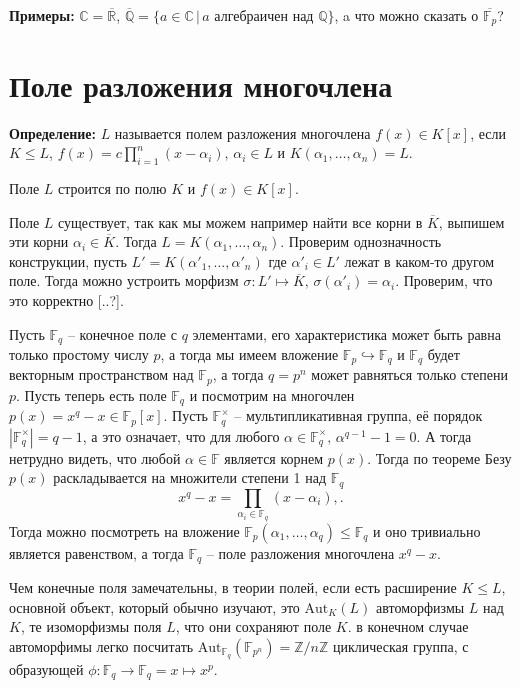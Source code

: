 \documentclass[a4paper, 12pt]{book}
\begin{document}
\textbf{Примеры:} $\mathbb{C}=\overline{\mathbb{R}}$, $\overline{\mathbb{Q}}=\{a\in
\mathbb{C}\,|\,a\text{ алгебраичен над }\mathbb{Q}\}$, a что можно сказать о
$\overline{\mathbb{F}_p}$?

\section{Поле разложения многочлена}

\textbf{Определение:} $L$ называется полем разложения многочлена $f(x)\in K[x]$,
если $K\le L$, $f(x)=c\prod_{i=1}^n(x-\alpha_i),\,\alpha_i\in L$ и $K(\alpha_1,
\ldots,\alpha_n)=L$.

Поле $L$ строится по полю $K$ и $f(x)\in K[x]$.

Поле $L$ существует, так как мы можем например найти все корни в $\overline K$,
выпишем эти корни $\alpha_i\in\overline K$. Тогда $L=K(\alpha_1,\ldots,\alpha_n)$.
Проверим однозначность конструкции, пусть $L'=K(\alpha'_1,\ldots,\alpha'_n)$
где $\alpha'_i\in L'$ лежат в каком-то другом поле. Тогда можно устроить
морфизм $\sigma:L'\mapsto\overline K,\,\sigma(\alpha'_i)=\alpha_i$. Проверим,
что это корректно [..?].

Пусть $\mathbb{F}_q$ – конечное поле с $q$ элементами, его характеристика может
быть равна только простому числу $p$, а тогда мы имеем вложение $\mathbb{F}_p
\hookrightarrow\mathbb{F}_q$ и $\mathbb{F}_q$ будет векторным пространством
над $\mathbb{F}_p$, а тогда $q=p^n$ может равняться только степени $p$. Пусть
теперь есть поле $\mathbb{F}_q$ и посмотрим на многочлен $p(x)=x^q-x\in
\mathbb{F}_p[x]$. Пусть $\mathbb{F}_q^\times$ – мультипликативная группа, её
порядок $|\mathbb{F}_q^ \times|=q-1$, а это означает, что для любого $\alpha\in
\mathbb{F}_q^\times,\,\alpha^{q-1}-1=0$. А тогда нетрудно видеть, что любой
$\alpha\in\mathbb{F}$ является корнем $p(x)$. Тогда по теореме Безу $p(x)$
раскладывается на множители степени 1 над $\mathbb{F}_q$
\[x^q-x=\prod_{\alpha_i\in\mathbb{F}_q}(x-\alpha_i),.\]
Тогда можно посмотреть на вложение $\mathbb{F}_p(\alpha_1,\ldots,\alpha_q)\le
\mathbb{F}_q$ и оно тривиально является равенством, а тогда $\mathbb{F}_q$ –
поле разложения многочлена $x^q-x$.

Чем конечные поля замечательны, в теории полей, если есть расширение $K\le L$,
основной объект, который обычно изучают, это $\text{Aut}_K(L)$ автоморфизмы $L$
над $K$, те изоморфизмы поля $L$, что они сохраняют поле $K$. в конечном случае
автоморфимы легко посчитать $\text{Aut}_{\mathbb{F}_q}(\mathbb{F}_{p^n})=
\mathbb{Z}/n\mathbb{Z}$ циклическая группа, с образующей $\phi:\mathbb{F}_q
\rightarrow\mathbb{F}_q=x\mapsto x^p$.
\end{document}
